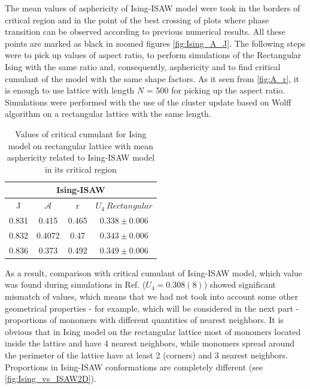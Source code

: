 \begin{figure}[h!]
    \centering
    
\end{figure}

The mean values of asphericity of Ising-ISAW model were took in the borders of critical region and in the point of the best crossing of plots where phase transition can be observed according to previous numerical results. All these points are marked as black in zoomed figures \ref{fig:Ising_A_J}. The following steps were to pick up values of aspect ratio, to perform simulations of the Rectangular Ising with the same ratio and, consequently, asphericity and to find critical cumulant of the model with the same shape factors. As it seen from \cref{fig:A_r}, it is enough to use lattice with length $N$ = 500 for picking up the aspect ratio. Simulations were performed with the use of the cluster update based on Wolff algorithm \cite{Newmanb1999} on a rectangular lattice with the same length.\\

\begin{table}[h]
    \centering
    \begin{tabular}{|c|c|c|c|}
        \hline
         \multicolumn{4}{|c|}{Ising-ISAW}  \\ \hline
         J & $\mathcal{A}$ & r & $U_{4}\  Rectangular$ \\ \hline
         0.831 & 0.415 & 0.465 & $0.338 \pm 0.006$\\ \hline
         0.832 & 0.4072 & 0.47 & $0.343 \pm 0.006$\\ \hline
         0.836 & 0.373 & 0.492 & $0.349 \pm 0.006$\\ \hline
         \end{tabular}
    \caption{Values of critical cumulant for Ising model on rectangular lattice with mean asphericity related to Ising-ISAW model in its critical region}
    \label{tab:A_r_U}
\end{table}


As a result, comparison with critical cumulant of Ising-ISAW model, which value was found during simulations in Ref.\cite{faizullina2021critical} ($U_{4} = 0.308(8)$) showed significant mismatch of values, which means that we had not took into account some other geometrical properties - for example, which will be considered in the next part - proportions of monomers with different quantities of nearest neighbors. It is obvious that in Ising model on the rectangular lattice most of monomers located inside the lattice and have 4 nearest neighbors, while monomers spread around the perimeter of the lattice have at least 2 (corners) and 3 nearest neighbors. Proportions in Ising-ISAW conformations are completely different (see \cref{fig:Ising_vs_ISAW2D}).

